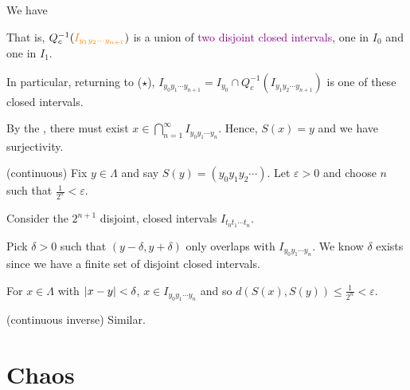 \documentclass[class=pmath370,tikz,notes]{agony}
\begin{document}
\begin{prf}
  We have
  \begin{center}
  \end{center}
  That is, $Q_c^{-1}(\textcolor{orange}{I_{y_1y_2\cdots y_{n+1}}})$
  is a union of \textcolor{purple}{two disjoint closed intervals}, one in $I_0$ and one in $I_1$.

  In particular, returning to ($\star$),
  $I_{y_0y_1\cdots y_{n+1}} = I_{y_0} \cap Q_c^{-1}(I_{y_1y_2\cdots y_{n+1}})$
  is one of these closed intervals.

  By the , there must exist $x \in \bigcap_{n=1}^\infty I_{y_0y_1\cdots y_n}$.
  Hence, $S(x) = y$ and we have surjectivity.

  (continuous) Fix $y \in \Lambda$ and say $S(y) = (y_0y_1y_2\cdots)$.
  Let $\varepsilon > 0$ and choose $n$ such that $\frac{1}{2^n} < \varepsilon$.

  Consider the $2^{n+1}$ disjoint, closed intervals $I_{t_0t_1\cdots t_n}$.

  Pick $\delta > 0$ such that $(y-\delta,y+\delta)$ only overlaps with $I_{y_0y_1\cdots y_n}$.
  We know $\delta$ exists since we have a finite set of disjoint closed intervals.

  For $x \in \Lambda$ with $\abs{x-y} < \delta$,
  $x \in I_{y_0y_1\cdots y_n}$ and so $d(S(x), S(y)) \leq \frac{1}{2^n} < \varepsilon$.

  (continuous inverse) Similar.
\end{prf}

\chapter{Chaos}
\end{document}
